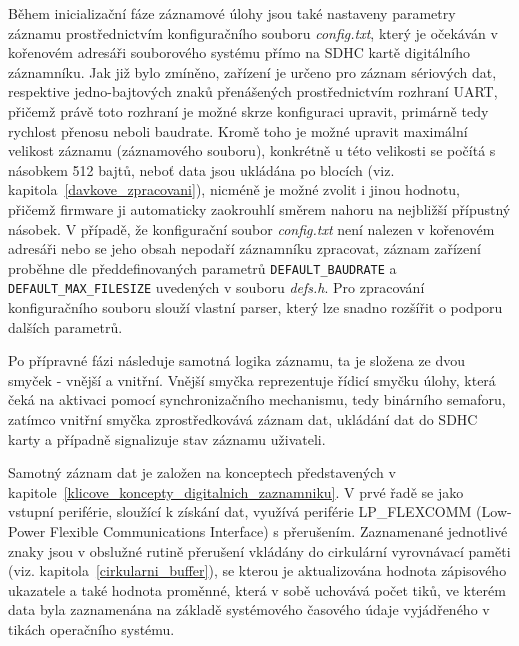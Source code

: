 Během inicializační fáze záznamové úlohy jsou také nastaveny parametry záznamu prostřednictvím konfiguračního souboru \textit{config.txt}, který je očekáván v kořenovém adresáři souborového systému přímo na SDHC kartě digitálního záznamníku. Jak již bylo zmíněno, zařízení je určeno pro záznam sériových dat, respektive jedno-bajtových znaků přenášených prostřednictvím rozhraní UART, přičemž právě toto rozhraní je možné skrze konfiguraci upravit, primárně tedy rychlost přenosu neboli baudrate. Kromě toho je možné upravit maximální velikost záznamu (záznamového souboru), konkrétně u této velikosti se počítá s násobkem 512 bajtů, neboť data jsou ukládána po blocích (viz. kapitola~\ref{davkove_zpracovani}), nicméně je možné zvolit i jinou hodnotu, přičemž firmware ji automaticky zaokrouhlí směrem nahoru na nejbližší přípustný násobek. V případě, že konfigurační soubor \textit{config.txt} není nalezen v kořenovém adresáři nebo se jeho obsah nepodaří záznamníku zpracovat, záznam zařízení proběhne dle předdefinovaných parametrů \texttt{DEFAULT\_BAUDRATE} a \texttt{DEFAULT\_MAX\_FILESIZE} uvedených v souboru \textit{defs.h}. Pro zpracování konfiguračního souboru slouží vlastní parser, který lze snadno rozšířit o podporu dalších parametrů.

Po přípravné fázi následuje samotná logika záznamu, ta je složena ze dvou smyček - vnější a vnitřní. Vnější smyčka reprezentuje řídicí smyčku úlohy, která čeká na aktivaci pomocí synchronizačního mechanismu, tedy binárního semaforu, zatímco vnitřní smyčka zprostředkovává záznam dat, ukládání dat do SDHC karty a případně signalizuje stav záznamu uživateli.

Samotný záznam dat je založen na konceptech představených v kapitole~\ref{klicove_koncepty_digitalnich_zaznamniku}. V prvé řadě se jako vstupní periférie, sloužící k získání dat, využívá periférie LP\_FLEXCOMM (Low-Power Flexible Communications Interface) s přerušením. Zaznamenané jednotlivé znaky jsou v obslužné rutině přerušení vkládány do cirkulární vyrovnávací paměti (viz. kapitola~\ref{cirkularni_buffer}), se kterou je aktualizována hodnota zápisového ukazatele a také hodnota proměnné, která v sobě uchovává počet tiků, ve kterém data byla zaznamenána na základě systémového časového údaje vyjádřeného v tikách operačního systému.

